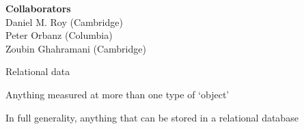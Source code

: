 \small
\renewcommand{\inserttotalframenumber}{11}

%

\begin{frame}
  \begin{block}{}
    \titlepage
  \end{block}
  \begin{center}
    {\bf  Collaborators}\\
    Daniel M. Roy (Cambridge)\\
    Peter Orbanz (Columbia)\\
    Zoubin Ghahramani (Cambridge)
  \end{center}
\end{frame}

\begin{frame}{Relational data}
  \begin{block}{}
    Anything measured at more than one type of `object'
  \end{block}
  \begin{block}{}
  	\center
	\vspace{-1\baselineskip}
    
  \end{block}
  \begin{block}{}
    In full generality, anything that can be stored in a relational database
  \end{block}
\end{frame}

